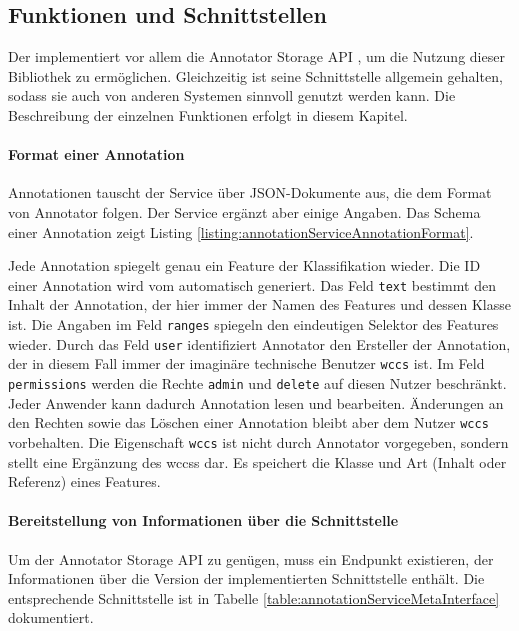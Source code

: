 \subsection{Funktionen und Schnittstellen}
    \label{section:solutionDetailsAnnotationServiceFunctions}
    Der {\annotationService} implementiert vor allem die
    Annotator Storage API \cite[Kapitel "`Storage"']{annotator:documentation},
    um die Nutzung dieser Bibliothek zu ermöglichen.
    Gleichzeitig ist seine Schnittstelle allgemein gehalten,
    sodass sie auch von anderen Systemen sinnvoll genutzt werden kann.
    Die Beschreibung der einzelnen Funktionen erfolgt in diesem Kapitel.

    \paragraph{Format einer Annotation}
    Annotationen tauscht der Service über JSON-Dokumente aus,
    die dem Format von Annotator \cite[Kapitel "`Annotation format"' ]{annotator:documentation} folgen.
    Der Service ergänzt aber einige Angaben.
    Das Schema einer Annotation zeigt Listing \ref{listing:annotationServiceAnnotationFormat}.

    

    Jede Annotation spiegelt genau ein Feature der Klassifikation wieder.
    Die ID einer Annotation wird vom {\annotationService} automatisch
    generiert.
    Das Feld \texttt{text} bestimmt den Inhalt der Annotation,
    der hier immer der Namen des Features und dessen Klasse ist.
    Die Angaben im Feld \texttt{ranges} spiegeln den eindeutigen Selektor des Features wieder.
    Durch das Feld \texttt{user} identifiziert Annotator den Ersteller der Annotation,
    der in diesem Fall immer der imaginäre technische Benutzer \texttt{wccs} ist.
    Im Feld \texttt{permissions} werden die Rechte \texttt{admin} und \texttt{delete} auf diesen Nutzer beschränkt.
    Jeder Anwender kann dadurch Annotation lesen und bearbeiten.
    Änderungen an den Rechten sowie das Löschen einer Annotation bleibt aber dem Nutzer \texttt{wccs} vorbehalten.
    Die Eigenschaft \texttt{wccs} ist nicht durch Annotator vorgegeben,
    sondern stellt eine Ergänzung des \glspl{wccs} dar.
    Es speichert die Klasse und Art (Inhalt oder Referenz) eines Features.

    \paragraph{Bereitstellung von Informationen über die Schnittstelle}
    Um der Annotator Storage API \cite[Kapitel "`Storage"' ]{annotator:documentation} zu genügen,
    muss ein Endpunkt existieren,
    der Informationen über die Version der implementierten Schnittstelle
    enthält.
    Die entsprechende Schnittstelle ist in Tabelle
    \ref{table:annotationServiceMetaInterface} dokumentiert.

